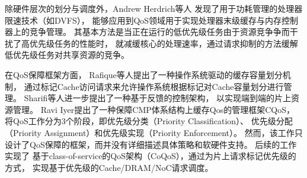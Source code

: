 

除硬件层次的划分与调度外，Andrew Herdrich等人\cite{herdrich_rate-based_2009}
发现了用于功耗管理的处理器限速技术（如DVFS），
能够应用到QoS领域用于实现处理器末级缓存与内存控制器上的竞争管理。
其基本方法是当正在运行的低优先级任务由于资源竞争争而干扰了高优先级任务的性能时，
就减缓核心的处理速率，通过请求抑制的方法缓解低优先级任务对共享资源的竞争。

在QoS保障框架方面，
Rafique等人提出了一种操作系统驱动的缓存容量划分机制\cite{Rafique:2006:ASO}，
通过标记Cache访问请求来允许操作系统根据标记对Cache容量划分进行管理。
Sharifi等人进一步提出了一种基于反馈的控制架构\cite{sharifi_mete:_2011}，
以实现端到端的片上资源管理。
Ravi Iyer提出了一种保障CMP体系结构上缓存Qos的管理框架CQoS\cite{iyer_cqos:_2004}，
将QoS工作分为3个阶段，即优先级分类（Priority Classification）、
优先级分配（Priority Assignment）和优先级实现（Priority Enforcement）。
然而，该工作只设计了QoS保障的框架，而并没有详细描述具体策略和软硬件支持。
后续的工作\cite{iyer_qos_2007, li_coqos:_2011, li_dynamic_2012}实现了
基于class-of-service的QoS架构（CoQoS），通过为片上请求标记优先级的方式，
实现基于优先级的Cache/DRAM/NoC请求调度。

\fi
